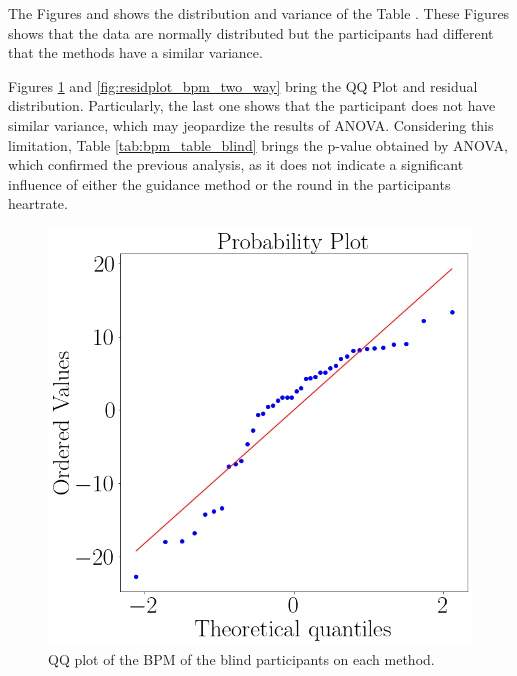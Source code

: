 The Figures  and  shows the distribution and variance of the Table . These Figures shows that the data are normally distributed but the participants had different  that the methods have a similar variance.

Figures \ref{fig:qqplot_bpm_two_way} and \ref{fig:residplot_bpm_two_way} bring the QQ Plot and residual distribution. Particularly, the last one shows that the participant does not have similar variance, which may jeopardize the results of ANOVA. Considering this limitation, Table \ref{tab:bpm_table_blind} brings the p-value obtained by ANOVA, which confirmed the previous analysis, as it does not indicate a significant influence of either the guidance method or the round in the participants heartrate. 

\begin{figure}[!htb]
    \centering
    \begin{minipage}{0.45\textwidth}
        \centering
        \includegraphics[width = 0.8\linewidth]{Resultados/ECG/Figuras/png/qqplot_bpm_two_way_blind.png}
        \caption{QQ plot of the BPM of the blind participants on each method.}
        \label{fig:qqplot_bpm_two_way}
    \end{minipage}
    \begin{minipage}{0.45\textwidth}
        \centering

\end{minipage}
\end{figure}
